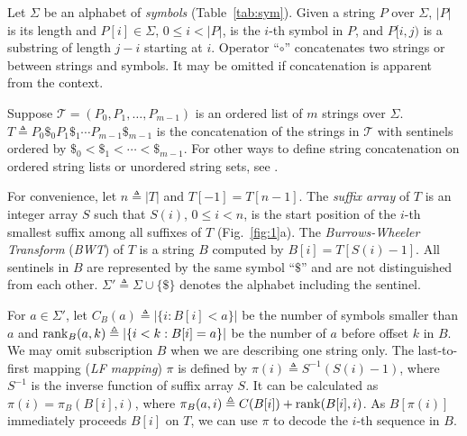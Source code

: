 \documentclass[webpdf,contemporary,large,namedate]{oup-authoring-template}%
\begin{document}
Let $\Sigma$ be an alphabet of \emph{symbols} (Table~\ref{tab:sym}).
Given a string $P$ over $\Sigma$, $|P|$ is its length and $P[i]\in\Sigma$, $0\le i<|P|$, is the $i$-th symbol in $P$,
and $P[i,j)$ is a substring of length $j-i$ starting at $i$.
Operator ``$\circ$'' concatenates two strings or between strings and symbols.
It may be omitted if concatenation is apparent from the context.

Suppose $\mathcal{T}=(P_0,P_1,\ldots,P_{m-1})$ is an ordered list of $m$ strings over $\Sigma$.
$T\triangleq P_0\$_0P_1\$_1\cdots P_{m-1}\$_{m-1}$ is the concatenation of the strings in $\mathcal{T}$
with sentinels ordered by $\$_0<\$_1<\cdots<\$_{m-1}$.
For other ways to define string concatenation on ordered string lists or unordered string sets, see \citet{Cenzato:2024ab}.

For convenience, let $n\triangleq|T|$ and $T[-1]=T[n-1]$.
The \emph{suffix array} of $T$ is an integer array $S$ such that $S(i)$,
$0\le i<n$, is the start position of the $i$-th smallest suffix among all suffixes of $T$ (Fig.~\ref{fig:1}a).
The \emph{Burrows-Wheeler Transform} (\emph{BWT}) of $T$ is a string $B$ computed by $B[i]=T[S(i)-1]$.
All sentinels in $B$ are represented by the same symbol ``$\$$'' and are not distinguished from each other.
$\Sigma'\triangleq\Sigma\cup\{\$\}$ denotes the alphabet including the sentinel.

For $a\in\Sigma'$, let $C_B(a)\triangleq|\{i:B[i]<a\}|$ be the number of symbols smaller than $a$
and ${\rm rank}_B(a,k)\triangleq|\{i<k:B[i]=a\}|$ be the number of $a$ before offset $k$ in $B$.
We may omit subscription $B$ when we are describing one string only.
The last-to-first mapping (\emph{LF mapping}) $\pi$ is defined by $\pi(i)\triangleq S^{-1}(S(i)-1)$,
where $S^{-1}$ is the inverse function of suffix array $S$.
It can be calculated as $\pi(i)=\pi_B(B[i],i)$, where $\pi_B(a,i)\triangleq C(B[i])+{\rm rank}(B[i],i)$.
As $B[\pi(i)]$ immediately proceeds $B[i]$ on $T$, we can use $\pi$ to decode the $i$-th sequence in $B$.
\end{document}
